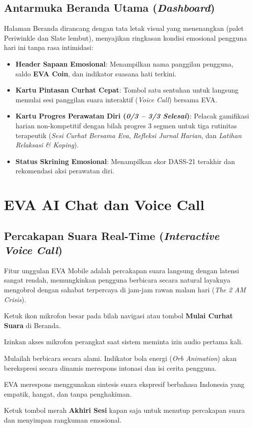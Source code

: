 \subsection{Antarmuka Beranda Utama (\textit{Dashboard})}
Halaman Beranda dirancang dengan tata letak visual yang menenangkan (palet Periwinkle dan Slate lembut), menyajikan ringkasan kondisi emosional pengguna hari ini tanpa rasa intimidasi:
\begin{itemize}[leftmargin=1.4em]
  \item \textbf{Header Sapaan Emosional}: Menampilkan nama panggilan pengguna, saldo \textbf{EVA Coin}, dan indikator suasana hati terkini.
  \item \textbf{Kartu Pintasan Curhat Cepat}: Tombol satu sentuhan untuk langsung memulai sesi panggilan suara interaktif (\textit{Voice Call}) bersama EVA.
  \item \textbf{Kartu Progres Perawatan Diri (\textit{0/3 -- 3/3 Selesai})}: Pelacak gamifikasi harian non-kompetitif dengan bilah progres 3 segmen untuk tiga rutinitas terapeutik (\textit{Sesi Curhat Bersama Eva}, \textit{Refleksi Jurnal Harian}, dan \textit{Latihan Relaksasi \& Koping}).
  \item \textbf{Status Skrining Emosional}: Menampilkan skor DASS-21 terakhir dan rekomendasi aksi perawatan diri.
\end{itemize}


\section{EVA AI Chat dan Voice Call}

\subsection{Percakapan Suara Real-Time (\textit{Interactive Voice Call})}
Fitur unggulan EVA Mobile adalah percakapan suara langsung dengan latensi sangat rendah, memungkinkan pengguna berbicara secara natural layaknya mengobrol dengan sahabat terpercaya di jam-jam rawan malam hari (\textit{The 2 AM Crisis}).

\begin{steplist}
  \item Ketuk ikon mikrofon besar pada bilah navigasi atau tombol \textbf{Mulai Curhat Suara} di Beranda.
  \item Izinkan akses mikrofon perangkat saat sistem meminta izin audio pertama kali.
  \item Mulailah berbicara secara alami. Indikator bola energi (\textit{Orb Animation}) akan berekspresi secara dinamis merespons intonasi dan isi cerita pengguna.
  \item EVA merespons menggunakan sintesis suara ekspresif berbahasa Indonesia yang empatik, hangat, dan tanpa penghakiman.
  \item Ketuk tombol merah \textbf{Akhiri Sesi} kapan saja untuk menutup percakapan suara dan menyimpan rangkuman emosional.
\end{steplist}

